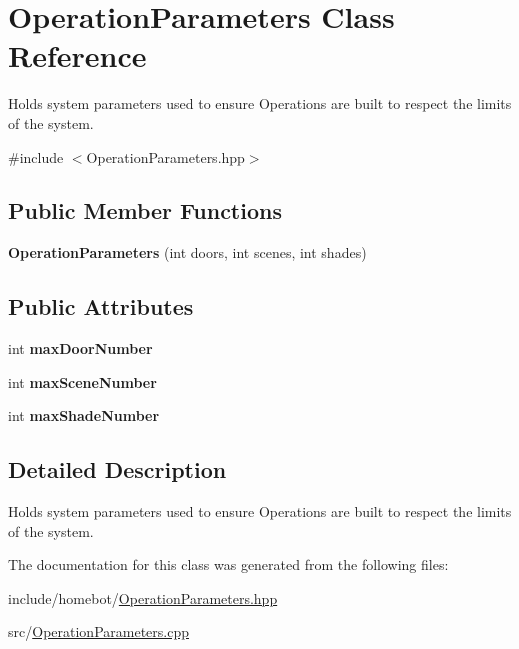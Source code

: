 \hypertarget{classOperationParameters}{\section{Operation\-Parameters Class Reference}
\label{classOperationParameters}
}


Holds system parameters used to ensure Operations are built to respect the limits of the system.  




{\ttfamily \#include $<$Operation\-Parameters.\-hpp$>$}

\subsection*{Public Member Functions}
\begin{DoxyCompactItemize}
\item 
\hypertarget{classOperationParameters_a6612fc100361e96ad9dc3310d3033f44}{{\bfseries Operation\-Parameters} (int doors, int scenes, int shades)}\label{classOperationParameters_a6612fc100361e96ad9dc3310d3033f44}

\end{DoxyCompactItemize}
\subsection*{Public Attributes}
\begin{DoxyCompactItemize}
\item 
\hypertarget{classOperationParameters_aad3af0d084a3e55d4b7595b0ee5e609d}{int {\bfseries max\-Door\-Number}}\label{classOperationParameters_aad3af0d084a3e55d4b7595b0ee5e609d}

\item 
\hypertarget{classOperationParameters_a6fd5bb82965ea3eb27bce419faabd9fc}{int {\bfseries max\-Scene\-Number}}\label{classOperationParameters_a6fd5bb82965ea3eb27bce419faabd9fc}

\item 
\hypertarget{classOperationParameters_a50268d382e63ed6f25271b13b4342be1}{int {\bfseries max\-Shade\-Number}}\label{classOperationParameters_a50268d382e63ed6f25271b13b4342be1}

\end{DoxyCompactItemize}


\subsection{Detailed Description}
Holds system parameters used to ensure Operations are built to respect the limits of the system. 

The documentation for this class was generated from the following files\-:\begin{DoxyCompactItemize}
\item 
include/homebot/\hyperlink{OperationParameters_8hpp}{Operation\-Parameters.\-hpp}\item 
src/\hyperlink{OperationParameters_8cpp}{Operation\-Parameters.\-cpp}\end{DoxyCompactItemize}
